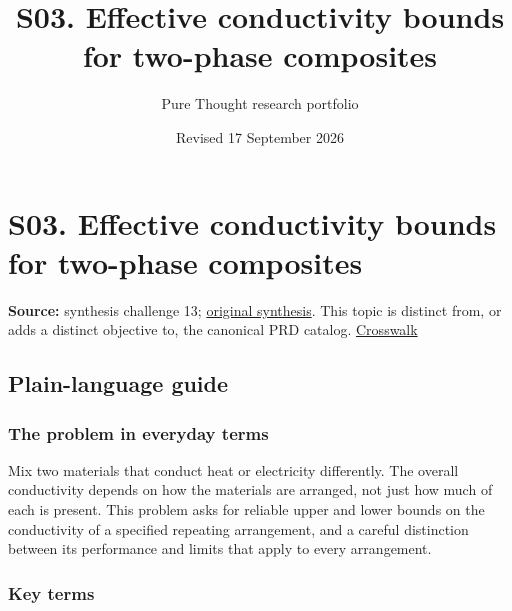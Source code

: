 \documentclass[
  11pt,
]{article}
\title{S03. Effective conductivity bounds for two-phase composites}
\author{Pure Thought research portfolio}
\date{Revised 17 September 2026}
\begin{document}
\maketitle
\thispagestyle{empty}
\clearpage

\section{S03. Effective conductivity bounds for two-phase composites}

\textbf{Source:} synthesis challenge 13;
\href{https://github.com/rick-stevens-ai/Pure-Thought/blob/main/NOTES/30-Most-Compelling-Pure-Thought-AI-Challenges.md}{original
synthesis}. This topic is distinct from, or adds a distinct objective
to, the canonical PRD catalog.
\href{https://github.com/rick-stevens-ai/Pure-Thought/blob/main/reviews/SYNTHESIS-CROSSWALK.md}{Crosswalk}

\subsection{Plain-language guide}

\subsubsection{The problem in everyday terms}

Mix two materials that conduct heat or electricity differently. The
overall conductivity depends on how the materials are arranged, not just
how much of each is present. This problem asks for reliable upper and
lower bounds on the conductivity of a specified repeating arrangement,
and a careful distinction between its performance and limits that apply
to every arrangement.

\subsubsection{Key terms}
\end{document}
